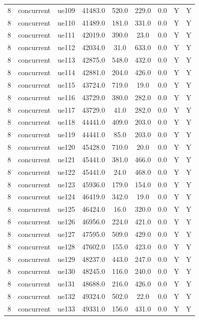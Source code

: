 \begin{table}[ht]
\begin{tabular}{|c|c|c|c|c|c|c|c|c|}
8 & concurrent & ue109 & 41483.0 & 520.0 & 229.0 & 0.0 & Y & Y \\
8 & concurrent & ue110 & 41489.0 & 181.0 & 331.0 & 0.0 & Y & Y \\
8 & concurrent & ue111 & 42019.0 & 390.0 & 23.0 & 0.0 & Y & Y \\
8 & concurrent & ue112 & 42034.0 & 31.0 & 633.0 & 0.0 & Y & Y \\
8 & concurrent & ue113 & 42875.0 & 548.0 & 432.0 & 0.0 & Y & Y \\
8 & concurrent & ue114 & 42881.0 & 204.0 & 426.0 & 0.0 & Y & Y \\
8 & concurrent & ue115 & 43724.0 & 719.0 & 19.0 & 0.0 & Y & Y \\
8 & concurrent & ue116 & 43729.0 & 380.0 & 282.0 & 0.0 & Y & Y \\
8 & concurrent & ue117 & 43729.0 & 41.0 & 282.0 & 0.0 & Y & Y \\
8 & concurrent & ue118 & 44441.0 & 409.0 & 203.0 & 0.0 & Y & Y \\
8 & concurrent & ue119 & 44441.0 & 85.0 & 203.0 & 0.0 & Y & Y \\
8 & concurrent & ue120 & 45428.0 & 710.0 & 20.0 & 0.0 & Y & Y \\
8 & concurrent & ue121 & 45441.0 & 381.0 & 466.0 & 0.0 & Y & Y \\
8 & concurrent & ue122 & 45441.0 & 24.0 & 468.0 & 0.0 & Y & Y \\
8 & concurrent & ue123 & 45936.0 & 179.0 & 154.0 & 0.0 & Y & Y \\
8 & concurrent & ue124 & 46419.0 & 342.0 & 19.0 & 0.0 & Y & Y \\
8 & concurrent & ue125 & 46424.0 & 16.0 & 320.0 & 0.0 & Y & Y \\
8 & concurrent & ue126 & 46956.0 & 224.0 & 421.0 & 0.0 & Y & Y \\
8 & concurrent & ue127 & 47595.0 & 509.0 & 429.0 & 0.0 & Y & Y \\
8 & concurrent & ue128 & 47602.0 & 155.0 & 423.0 & 0.0 & Y & Y \\
8 & concurrent & ue129 & 48237.0 & 443.0 & 247.0 & 0.0 & Y & Y \\
8 & concurrent & ue130 & 48245.0 & 116.0 & 240.0 & 0.0 & Y & Y \\
8 & concurrent & ue131 & 48688.0 & 216.0 & 426.0 & 0.0 & Y & Y \\
8 & concurrent & ue132 & 49324.0 & 502.0 & 22.0 & 0.0 & Y & Y \\
8 & concurrent & ue133 & 49331.0 & 156.0 & 431.0 & 0.0 & Y & Y \\

\end{tabular}
\end{table}
